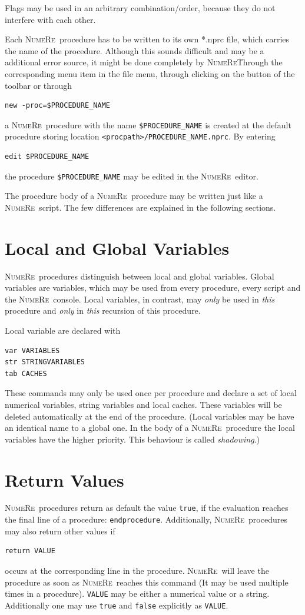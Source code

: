 \documentclass[DIV=14,headsepline,footsepline]{scrbook}
\newcommand{\NR}{\textsc{Nu\-me\-Re}}
\begin{document}
				Flags may be used in an arbitrary combination/order, because they do not interfere with each other.
				
				Each \NR\ procedure has to be written to its own *.nprc file, which carries the name of the procedure. Although this sounds difficult and may be a additional error source, it might be done completely by \NR\. Through the corresponding menu item in the file menu, through clicking on the button of the toolbar or through
				\begin{lstlisting}
new -proc=$PROCEDURE_NAME
				\end{lstlisting}
				a \NR\ procedure with the name \lstinline+$PROCEDURE_NAME+ is created at the default procedure storing location \lstinline+<procpath>/PROCEDURE_NAME.nprc+. By entering 
				\begin{lstlisting}
edit $PROCEDURE_NAME
				\end{lstlisting}
				the procedure \lstinline+$PROCEDURE_NAME+ may be edited in the \NR\ editor.
				
				The procedure body of a \NR\ procedure may be written just like a \NR\ script. The few differences are explained in the following sections.
			\section{Local and Global Variables}
				\NR\ procedures distinguish between local and global variables. Global variables are variables, which may be used from every procedure, every script and the \NR\ console. Local variables, in contrast, may \emph{only} be used in \emph{this} procedure and \emph{only} in \emph{this} recursion of this procedure.
				
				Local variable are declared with
				\begin{lstlisting}
var VARIABLES
str STRINGVARIABLES
tab CACHES
				\end{lstlisting}
				These commands may only be used once per procedure and declare a set of local numerical variables, string variables and local caches. These variables will be deleted automatically at the end of the procedure. (Local variables may be have an identical name to a global one. In the body of a \NR\ procedure the local variables have the higher priority. This behaviour is called \emph{shadowing}.)
			\section{Return Values}
				\NR\ procedures return as default the value \lstinline+true+, if the evaluation reaches the final line of a procedure: \lstinline+endprocedure+. Additionally, \NR\ procedures may also return other values if
				\begin{lstlisting}
return VALUE
				\end{lstlisting}
				occurs at the corresponding line in the procedure. \NR\ will leave the procedure as soon as \NR\ reaches this command (It may be used multiple times in a procedure). \lstinline+VALUE+ may be either a numerical value or a string. Additionally one may use \lstinline+true+ and \lstinline+false+ explicitly as \lstinline+VALUE+.
				
\end{document}
